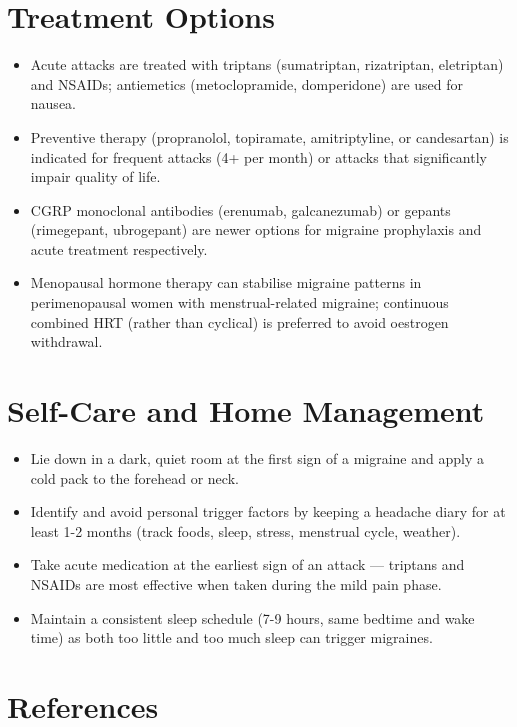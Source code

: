\section*{Treatment Options}
\begin{itemize}
  \item Acute attacks are treated with triptans (sumatriptan, rizatriptan, eletriptan) and NSAIDs; antiemetics (metoclopramide, domperidone) are used for nausea.
  \item Preventive therapy (propranolol, topiramate, amitriptyline, or candesartan) is indicated for frequent attacks (4+ per month) or attacks that significantly impair quality of life.
  \item CGRP monoclonal antibodies (erenumab, galcanezumab) or gepants (rimegepant, ubrogepant) are newer options for migraine prophylaxis and acute treatment respectively.
  \item Menopausal hormone therapy can stabilise migraine patterns in perimenopausal women with menstrual-related migraine; continuous combined HRT (rather than cyclical) is preferred to avoid oestrogen withdrawal.
\end{itemize}

\section*{Self-Care and Home Management}
\begin{itemize}
  \item Lie down in a dark, quiet room at the first sign of a migraine and apply a cold pack to the forehead or neck.
  \item Identify and avoid personal trigger factors by keeping a headache diary for at least 1-2 months (track foods, sleep, stress, menstrual cycle, weather).
  \item Take acute medication at the earliest sign of an attack — triptans and NSAIDs are most effective when taken during the mild pain phase.
  \item Maintain a consistent sleep schedule (7-9 hours, same bedtime and wake time) as both too little and too much sleep can trigger migraines.
\end{itemize}

\section*{References}


